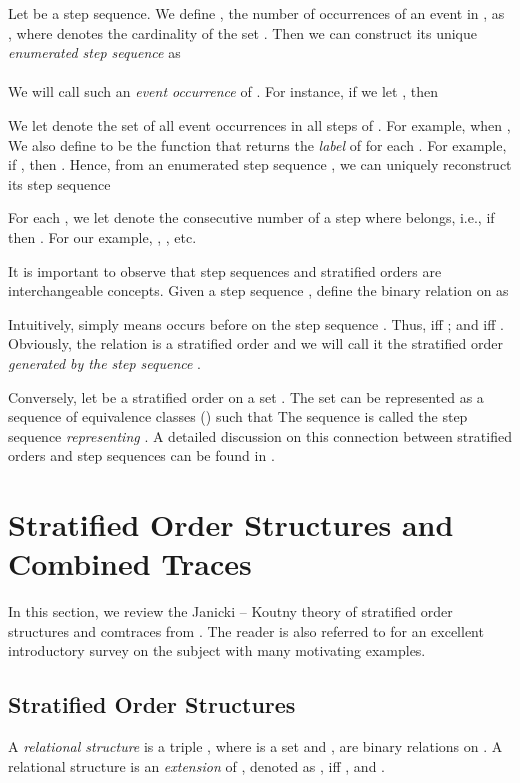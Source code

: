 \documentclass{llncs}
\begin{document}
Let  be a step sequence. We define  , the number of occurrences of an event  in , as , where  denotes the cardinality of the set .  
Then we can construct its unique \emph{enumerated step sequence}  as\\
\mbox{\hspace{2.5cm}}\\
We will call such  an \emph{event occurrence} of . For instance, if we let  ,
then   

We let  denote the set of all event occurrences in all steps of . For example, when
,  We also define  to be the function that returns the \emph{label} of  for each . For example, if , then . Hence, from an enumerated step sequence , we can uniquely reconstruct its step sequence 


For each , we let  denote the consecutive number of a step where  belongs, i.e., if  then . For our example, ,  , etc.

It is important to observe that step sequences and stratified orders are interchangeable concepts. Given a step sequence , define the binary relation   on  as\\
\mbox{\hspace{3.6cm}}

Intuitively,  simply means  occurs before  on the step sequence . Thus,  iff ; and  iff  . Obviously, the relation  is a stratified order and we will call it the stratified order {\em generated by the step sequence} .


Conversely, let  be a stratified order on a set . The set  can be represented as a
sequence of equivalence classes  () such that 
The sequence  is called the step sequence \emph{representing} . A detailed discussion on this connection between stratified orders and step sequences can be found in \cite{JL09}.







\section{Stratified Order Structures and Combined Traces}
In this section, we review the Janicki -- Koutny theory of stratified order structures and comtraces from \cite{JK95,JK97}. The reader is also referred to \cite{KK08} for an excellent introductory survey on the subject with many motivating examples.

\subsection{Stratified Order Structures}
A \emph{relational structure} is a triple , where  is a set and ,  are binary relations on . A relational structure  is an \emph{extension} of , denoted as , iff ,  and .
\end{document}

